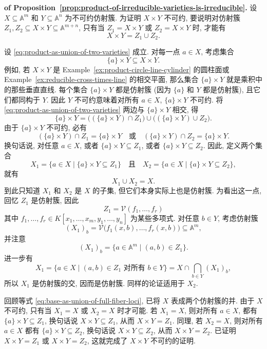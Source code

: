 \begin{Proof}\textbf{of Proposition~\ref{prop:product-of-irreducible-varieties-is-irreducible}.}\quad
设 $X\subseteq\mathbb{A}^{m}$ 和 $Y\subseteq\mathbb{A}^{n}$ 为不可约仿射簇. 为证明 $X\times Y$ 不可约, 要说明对仿射簇 $Z_{1},Z_{2}\subseteq X\times Y\subseteq\mathbb{A}^{m+n}$, 只有当 $Z_{1}=X\times Y$ 或 $Z_{2}=X\times Y$ 时, 才能有
\begin{equation}\label{eq:product-as-union-of-two-varieties}
  X\times Y=Z_{1}\cup Z_{2}.
\end{equation}

设 \eqref{eq:product-as-union-of-two-varieties} 成立. 对每一点 $a\in X$, 考虑集合
\[
  \{a\}\times Y\subseteq X\times Y.
\]
例如, 若 $X\times Y$ 是 Example~\ref{ex:product-circle-line-cylinder} 的圆柱面或 Example~\ref{ex:reducible-cross-times-line} 的相交平面, 那么集合 $\{a\}\times Y$ 就是乘积中的那些垂直直线. 每个集合 $\{a\}\times Y$ 都是仿射簇 (因为 $\{a\}$ 和 $Y$ 都是仿射簇), 且它们都同构于 $Y$. 因此 $Y$ 不可约意味着对所有 $a\in X$, $\{a\}\times Y$ 不可约. 将 \eqref{eq:product-as-union-of-two-varieties} 两边与 $\{a\}\times Y$ 相交, 得
\[
  \{a\}\times Y
    =\bigl((\{a\}\times Y)\cap Z_{1}\bigr)\cup
     \bigl((\{a\}\times Y)\cup Z_{2}\bigr).
\]
由于 $\{a\}\times Y$ 不可约, 必有
\[
  (\{a\}\times Y)\cap Z_{1}=\{a\}\times Y
  \quad\text{或}\quad
  (\{a\}\times Y)\cap Z_{2}=\{a\}\times Y.
\]
换句话说, 对任意 $a\in X$, 或者 $\{a\}\times Y\subseteq Z_{1}$, 或者 $\{a\}\times Y\subseteq Z_{2}$. 因此, 定义两个集合
\[
  X_{1}=\{a\in X\mid\{a\}\times Y\subseteq Z_{1}\}
  \quad\text{且}\quad
  X_{2}=\{a\in X\mid\{a\}\times Y\subseteq Z_{2}\},
\]
就有
\begin{equation}\label{eq:base-as-union-of-full-fiber-loci}
  X_{1}\cup X_{2}=X.
\end{equation}
到此只知道 $X_{1}$ 和 $X_{2}$ 是 $X$ 的子集, 但它们本身实际上也是仿射簇. 为看出这一点, 回忆 $Z_{1}$ 是仿射簇, 因此
\[
  Z_{1}=\mathcal{V}(f_{1},\ldots,f_{r})
\]
其中 $f_{1},\ldots,f_{r}\in K[x_{1},\ldots,x_{m},y_{1},\ldots,y_{n}]$ 为某些多项式. 对任意 $b\in Y$, 考虑仿射簇
\[
  (X_{1})_{b}=\mathcal{V}\bigl(f_{1}(x,b),\ldots,f_{r}(x,b)\bigr)\subseteq\mathbb{A}^{m},
\]
并注意
\[
  (X_{1})_{b}=\{a\in\mathbb{A}^{m}\mid(a,b)\in Z_{1}\}.
\]
进一步有
\[
  X_{1}=\{a\in X\mid(a,b)\in Z_{1}\text{ 对所有 }b\in Y\}
    =X\cap\bigcap_{b\in Y}(X_{1})_{b},
\]
所以 $X_{1}$ 是仿射簇的交, 因而是仿射簇. 同样的论证适用于 $X_{2}$.

回顾等式 \eqref{eq:base-as-union-of-full-fiber-loci}, 已将 $X$ 表成两个仿射簇的并. 由于 $X$ 不可约, 只有当 $X_{1}=X$ 或 $X_{2}=X$ 时才可能. 若 $X_{1}=X$, 则对所有 $a\in X$, 都有 $\{a\}\times Y\subseteq Z_{1}$, 换句话说 $X\times Y\subseteq Z_{1}$, 从而 $X\times Y=Z_{1}$. 同理, 若 $X_{2}=X$, 则对所有 $a\in X$ 都有 $\{a\}\times Y\subseteq Z_{2}$, 换句话说 $X\times Y\subseteq Z_{2}$, 从而 $X\times Y=Z_{2}$. 已证明 $X\times Y=Z_{1}$ 或 $X\times Y=Z_{2}$, 这就完成了 $X\times Y$ 不可约的证明.
\end{Proof}

